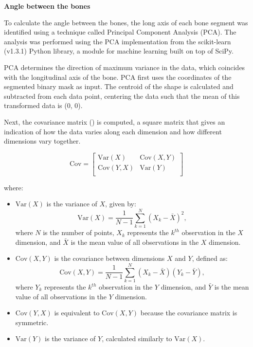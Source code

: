 \documentclass{micro-econ-thesis}
\begin{document}
\textbf{Angle between the bones}

To calculate the angle between the bones, the long axis of each bone segment was identified using a technique called Principal Component Analysis (PCA). The analysis was performed using the PCA implementation from the scikit-learn (v1.3.1) Python library, a module for machine learning built on top of SciPy.

PCA determines the direction of maximum variance in the data, which coincides with the longitudinal axis of the bone. PCA first uses the coordinates of the segmented binary mask as input. The centroid of the shape is calculated and subtracted from each data point, centering the data such that the mean of this transformed data is (0, 0). 

Next, the covariance matrix () is computed, a square matrix that gives an indication of how the data varies along each dimension and how different dimensions vary together. 

\begin{equation}
	\text{Cov} = 
	\begin{bmatrix}
		\mathrm{Var}(X) & \mathrm{Cov}(X,Y) \\
		\mathrm{Cov}(Y,X) & \mathrm{Var}(Y) \\
	\end{bmatrix}
	\label{eq:cov}
\end{equation}

where:
\begin{itemize}
	\item \(\mathrm{Var}(X)\) is the variance of \(X\), given by:
	\[
	\mathrm{Var}(X) = \frac{1}{N-1} \sum_{k=1}^{N} (X_{k} - \bar{X})^2,
	\]
	where \(N\) is the number of points, \(X_{k}\) represents the \(k^{th}\) observation in the \(X\) dimension, and \(\bar{X}\) is the mean value of all observations in the \(X\) dimension. 
	\item \(\mathrm{Cov}(X,Y)\) is the covariance between dimensions \(X\) and \(Y\), defined as:
	\[
	\mathrm{Cov}(X,Y) = \frac{1}{N-1} \sum_{k=1}^{N} (X_{k} - \bar{X})(Y_{k} - \bar{Y}),
	\]
	where \(Y_{k}\) represents the \(k^{th}\) observation in the \(Y\) dimension, and \(\bar{Y}\) is the mean value of all observations in the \(Y\) dimension.
	
	\item \(\mathrm{Cov}(Y,X)\) is equivalent to \(\mathrm{Cov}(X,Y)\) because the covariance matrix is symmetric.
	
	\item \(\mathrm{Var}(Y)\) is the variance of \(Y\), calculated similarly to \(\mathrm{Var}(X)\).
\end{itemize}
\end{document}
